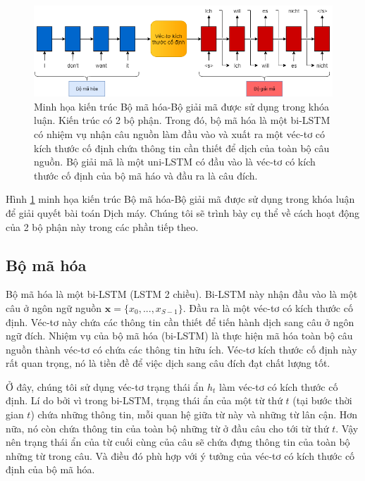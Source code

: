 \begin{figure}
	\centering
	\includegraphics[width=1.0\textwidth]{Encoder-Decoder_2}
	\caption[Minh họa kiến trúc Bộ mã hóa-Bộ giải mã được sử dụng trong khóa luận.]{Minh họa kiến trúc Bộ mã hóa-Bộ giải mã được sử dụng trong khóa luận. Kiến trúc có 2 bộ phận. Trong đó, bộ mã hóa là một bi-LSTM có nhiệm vụ nhận câu nguồn làm đầu vào và xuất ra một véc-tơ có kích thước cố định chứa thông tin cần thiết để dịch của toàn bộ câu nguồn. Bộ giải mã là một uni-LSTM có đầu vào là véc-tơ có kích thước cố định của bộ mã háo và đầu ra là câu đích.}
	\label{fig_Encoder-Decoder}
\end{figure}

Hình \ref{fig_Encoder-Decoder} minh họa kiến trúc Bộ mã hóa-Bộ giải mã được sử dụng trong khóa luận để giải quyết bài toán Dịch máy. Chúng tôi sẽ trình bày cụ thể về cách hoạt động của 2 bộ phận này trong các phần tiếp theo.

\subsection{Bộ mã hóa}
Bộ mã hóa là một bi-LSTM (LSTM 2 chiều). Bi-LSTM này nhận đầu vào là một câu ở ngôn ngữ nguồn $\bm{x} = \{x_0, ..., x_{S-1}\}$. Đầu ra là một véc-tơ có kích thước cố định. Véc-tơ này chứa các thông tin cần thiết để tiến hành dịch sang câu ở ngôn ngữ đích. Nhiệm vụ của bộ mã hóa (bi-LSTM) là thực hiện mã hóa toàn bộ câu nguồn thành véc-tơ có chứa các thông tin hữu ích. Véc-tơ kích thước cố định này rất quan trọng, nó là tiền đề để việc dịch sang câu đích đạt chất lượng tốt.

Ở đây, chúng tôi sử dụng véc-tơ trạng thái ẩn $h_t$ làm véc-tơ có kích thước cố định. Lí do bởi vì trong bi-LSTM, trạng thái ẩn của một từ thứ $t$ (tại bước thời gian $t$) chứa những thông tin, mỗi quan hệ giữa từ này và những từ lân cận. Hơn nữa, nó còn chứa thông tin của toàn bộ những từ ở đầu câu cho tới từ thứ $t$. Vậy nên trạng thái ẩn của từ cuối cùng của câu sẽ chứa đựng thông tin của toàn bộ những từ trong câu. Và điều đó phù hợp với ý tưởng của véc-tơ có kích thước cố định của bộ mã hóa. 

